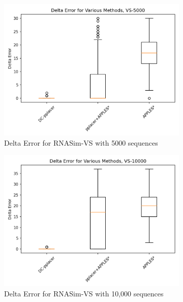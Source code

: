 \documentclass[10pt]{article}
\begin{document}
\begin{figure}[!htb]
\begin{subfigure}{0.5\textwidth}
\centering
\includegraphics[width=\textwidth]{Figs/VS-delta-error-5000.png}
\caption{Delta Error for RNASim-VS with 5000 sequences}
\label{fig:error5000}
\end{subfigure}
\begin{subfigure}{0.5\textwidth}
\centering
\includegraphics[width=\textwidth]{Figs/VS-delta-error-10000.png}
\caption{Delta Error for RNASim-VS with 10,000 sequences}
\label{fig:error10000}
\end{subfigure}\\
\begin{subfigure}{0.5\textwidth}
\centering

\end{subfigure}
\end{figure}
\end{document}
